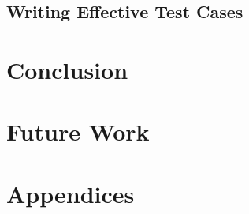 \documentclass[11pt]{article}
\begin{document}
\subsection{Writing Effective Test Cases}
\subsubsection{\cite{GoingFaster}}

\section{Conclusion}


\section{Future Work}


\section{Appendices}

\newpage





\nocite{*}
\end{document}

